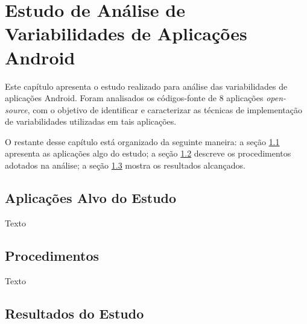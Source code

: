 \chapter{Estudo de Análise de Variabilidades de Aplicações Android}

Este capítulo apresenta  o estudo realizado para análise das variabilidades de
aplicações Android. Foram analisados os códigos-fonte de 8 aplicações \textit{open-source},
com o objetivo de identificar e caracterizar as técnicas de implementação de
variabilidades utilizadas em tais aplicações.

O restante desse capítulo está organizado da seguinte maneira: a seção \ref{sec:aplicacoes}
apresenta as aplicações algo do estudo;  a seção \ref{sec:procedimentos} descreve
os procedimentos adotados na análise; a seção \ref{sec:resultados} mostra os resultados alcançados. 


\section{Aplicações Alvo do Estudo}
\label{sec:aplicacoes}

Texto

\section{Procedimentos}
\label{sec:procedimentos}
Texto


\section{Resultados do Estudo}
\label{sec:resultados}
